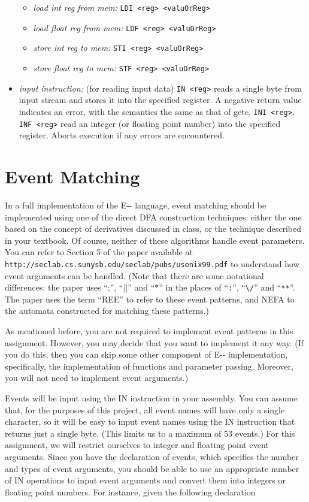\documentclass{article}
\begin{document}
\begin{itemize}
\begin{itemize}
    \item {\em load int reg from mem:}    \verb+LDI <reg> <valuOrReg>+
    \item {\em load float reg from mem:}  \verb+LDF <reg> <valuOrReg>+
    \item {\em store int reg to mem:}     \verb+STI <reg> <valuOrReg>+
    \item {\em store float reg to mem:}   \verb+STF <reg> <valuOrReg>+
  \end{itemize}
%
\item {\em input instruction:} (for reading input data)
      \verb+IN <reg>+ reads a single byte from input stream and stores it into
         the specified register. A negative return value indicates an
         error, with the semantics the same as that of getc.
      \verb+INI <reg>+, \verb+INF <reg>+ read an integer (or floating point number) into the 
         specified register. Aborts execution if any errors are encountered.
\end{itemize}

\section{Event Matching}
%
In a full implementation of the E-{}- language, event matching should be
implemented using one of the direct DFA construction techniques: either
the one based on the concept of derivatives discussed in class, or the
technique described in your textbook. Of course, neither of these
algorithms handle event parameters. You can refer to Section 5 of the
paper available at {\tt
  http://seclab.cs.sunysb.edu/seclab/pubs/usenix99.pdf} to understand how
event arguments can be handled. (Note that there are some notational
differences: the paper uses ``;'', ``$||$'' and ``$*$'' in the places of
``\verb+:+'', ``\verb+\/+'' and ``\verb+**+''. The paper uses the term
``REE'' to refer to these event patterns, and NEFA to the automata
constructed for matching these patterns.)

As mentioned before, you are not required to implement event
patterns in this assignment. However, you may decide that you
want to implement it any way. (If you do this, then you can
skip some other component of E-{}- implementation, specifically,
the implementation of functions and parameter passing. Moreover,
you will not need to implement event arguments.)

Events will be input using the IN instruction in your assembly. You can
assume that, for the purposes of this project, all event names will have
only a single character, so it will be easy to input event names using the
IN instruction that returns just a single byte. (This limits us to a
maximum of 53 events.) For this assignment, we will restrict
ourselves to integer and floating point event arguments. Since you have
the declaration of events, which specifies the number and types of event
arguments, you should be able to use an appropriate number of IN
operations to input event arguments and convert them into integers or
floating point numbers. For instance, given the following declaration
\end{document}
